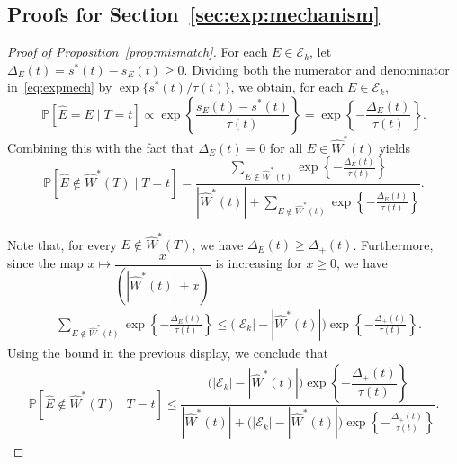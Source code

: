 \documentclass[12pt]{article}
\newcommand{\rbracket}[1]{\left[ #1 \right]}
\newcommand{\Pp}{{\mathbb{P}}}
\newcommand{\Ek}{\mathcal{E}_{k}}      %
\newcommand{\Ehat}{\widehat{E}}
\newcommand{\Estar}{\widehat{W}^*}
\begin{document}
\begin{appendices}


\subsection{Proofs for Section~\ref{sec:exp:mechanism}}


\begin{proof}[Proof of Proposition~\ref{prop:mismatch}]
For each $E \in \Ek$, let $\Delta_E(t) = s^*(t)-s_E(t)\geq 0$. 
Dividing both the numerator and denominator in~\eqref{eq:expmech} by $\exp\{s^*(t)/\tau(t)\}$, we obtain, for each $E\in\Ek$,
\[
\Pp\rbracket{\Ehat =E\mid T=t} \propto \exp\!\left\{
  \frac{s_E(t)-s^*(t)}{\tau(t)}
  \right\}
  =
  \exp\!\left\{
  -\frac{\Delta_E(t)}{\tau(t)}
  \right\}.
\]
Combining this with the fact that $\Delta_E(t)=0$ for all $E\in\Estar(t)$ yields
\[
\Pp\rbracket{\Ehat \notin \Estar(T)\mid T=t}
=
\frac{
\displaystyle
\sum_{E\notin\Estar(t)}
\exp\!\left\{
-\frac{\Delta_E(t)}{\tau(t)}
\right\}
}{
\displaystyle
|\Estar(t)|
+
\sum_{E\notin\Estar(t)}
\exp\!\left\{
-\frac{\Delta_E(t)}{\tau(t)}
\right\}
}.
\] 

Note that, for every $E\notin\Estar(T)$, we have $\Delta_E(t)\geq \Delta_+(t)$.
Furthermore, since the map $x\mapsto \dfrac{x}{(|\Estar(t)|+x)}$ is increasing for $x\geq 0$, we have
\begin{align*}
 & \sum_{E\notin\Estar(t)}
  \exp\!\left\{
  -\frac{\Delta_E(t)}{\tau(t)}
  \right\}
  \le
  \bigl(|\Ek|-|\Estar(t)|\bigr)
  \exp\!\left\{
  -\frac{\Delta_+(t)}{\tau(t)}
  \right\}.
\end{align*}  
Using the bound in the previous display, we conclude that
 \begin{align*} 
\Pp\rbracket{\Ehat \notin \Estar(T)\mid T=t}
\leq
\dfrac{
\bigl(|\Ek|-|\Estar(t)|\bigr)
  \exp\!\left\{
  -\dfrac{\Delta_+(t)}{\tau(t)}
  \right\}
}{
\displaystyle
|\Estar(t)|
+
\bigl(|\Ek|-|\Estar(t)|\bigr)
  \exp\!\left\{
  -\frac{\Delta_+(t)}{\tau(t)}
  \right\}
}.
\end{align*}  


\end{proof}
\end{appendices}
\end{document}

